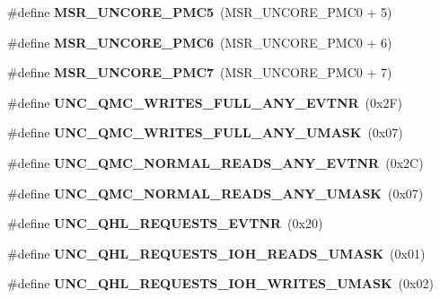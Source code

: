 \begin{DoxyCompactItemize}
\item 
\#define {\bfseries M\+S\+R\+\_\+\+U\+N\+C\+O\+R\+E\+\_\+\+P\+M\+C5}~(M\+S\+R\+\_\+\+U\+N\+C\+O\+R\+E\+\_\+\+P\+M\+C0 + 5)\label{types_8h_a0feaf89fcc2184adf2fdf25f7b91a4ef}

\item 
\#define {\bfseries M\+S\+R\+\_\+\+U\+N\+C\+O\+R\+E\+\_\+\+P\+M\+C6}~(M\+S\+R\+\_\+\+U\+N\+C\+O\+R\+E\+\_\+\+P\+M\+C0 + 6)\label{types_8h_ad6eb53ff302cbe4e49539f0dcd2732d4}

\item 
\#define {\bfseries M\+S\+R\+\_\+\+U\+N\+C\+O\+R\+E\+\_\+\+P\+M\+C7}~(M\+S\+R\+\_\+\+U\+N\+C\+O\+R\+E\+\_\+\+P\+M\+C0 + 7)\label{types_8h_a1c7b14ded17a8e1a216c908b5f6f84b7}

\item 
\#define {\bfseries U\+N\+C\+\_\+\+Q\+M\+C\+\_\+\+W\+R\+I\+T\+E\+S\+\_\+\+F\+U\+L\+L\+\_\+\+A\+N\+Y\+\_\+\+E\+V\+T\+N\+R}~(0x2\+F)\label{types_8h_a4f51d39c0b2c93cc8b109a94e6314118}

\item 
\#define {\bfseries U\+N\+C\+\_\+\+Q\+M\+C\+\_\+\+W\+R\+I\+T\+E\+S\+\_\+\+F\+U\+L\+L\+\_\+\+A\+N\+Y\+\_\+\+U\+M\+A\+S\+K}~(0x07)\label{types_8h_a9dd4b0b4cf1bb831b9e34773c59dbeed}

\item 
\#define {\bfseries U\+N\+C\+\_\+\+Q\+M\+C\+\_\+\+N\+O\+R\+M\+A\+L\+\_\+\+R\+E\+A\+D\+S\+\_\+\+A\+N\+Y\+\_\+\+E\+V\+T\+N\+R}~(0x2\+C)\label{types_8h_a097baf5419e07e930219946420c0e257}

\item 
\#define {\bfseries U\+N\+C\+\_\+\+Q\+M\+C\+\_\+\+N\+O\+R\+M\+A\+L\+\_\+\+R\+E\+A\+D\+S\+\_\+\+A\+N\+Y\+\_\+\+U\+M\+A\+S\+K}~(0x07)\label{types_8h_a386070eca92af21fadab353ab255fe75}

\item 
\#define {\bfseries U\+N\+C\+\_\+\+Q\+H\+L\+\_\+\+R\+E\+Q\+U\+E\+S\+T\+S\+\_\+\+E\+V\+T\+N\+R}~(0x20)\label{types_8h_a73f427253368afcb09bdc9e014beb78b}

\item 
\#define {\bfseries U\+N\+C\+\_\+\+Q\+H\+L\+\_\+\+R\+E\+Q\+U\+E\+S\+T\+S\+\_\+\+I\+O\+H\+\_\+\+R\+E\+A\+D\+S\+\_\+\+U\+M\+A\+S\+K}~(0x01)\label{types_8h_af8e9aeb55fcaf7733e59b551e9f2e78e}

\item 
\#define {\bfseries U\+N\+C\+\_\+\+Q\+H\+L\+\_\+\+R\+E\+Q\+U\+E\+S\+T\+S\+\_\+\+I\+O\+H\+\_\+\+W\+R\+I\+T\+E\+S\+\_\+\+U\+M\+A\+S\+K}~(0x02)\label{types_8h_abe67ec964875ae4eaa22e667cbac2b32}


\end{DoxyCompactItemize}
